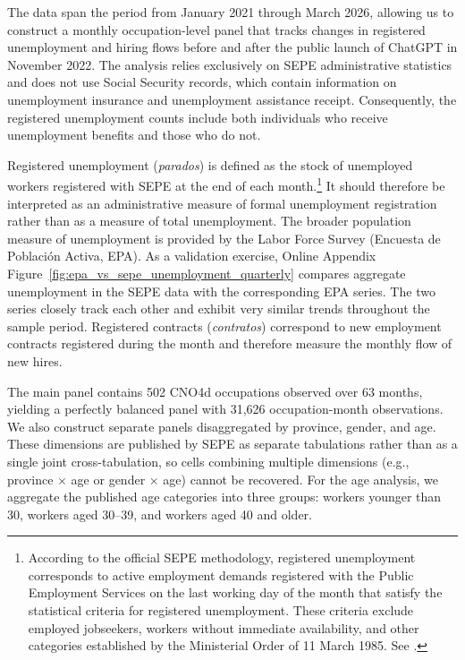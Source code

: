 The data span the period from January 2021 through March 2026, allowing us to construct a monthly occupation-level panel that tracks changes in registered unemployment and hiring flows before and after the public launch of ChatGPT in November 2022. The analysis relies exclusively on SEPE administrative statistics and does not use Social Security records, which contain information on unemployment insurance and unemployment assistance receipt. Consequently, the registered unemployment counts include both individuals who receive unemployment benefits and those who do not.

Registered unemployment (\textit{parados}) is defined as the stock of unemployed workers registered with SEPE at the end of each month.\footnote{According to the official SEPE methodology, registered unemployment corresponds to active employment demands registered with the Public Employment Services on the last working day of the month that satisfy the statistical criteria for registered unemployment. These criteria exclude employed jobseekers, workers without immediate availability, and other categories established by the Ministerial Order of 11 March 1985. See \citet{mites_mlr_methodology}.} It should therefore be interpreted as an administrative measure of formal unemployment registration rather than as a measure of total unemployment. The broader population measure of unemployment is provided by the Labor Force Survey (Encuesta de Poblaci\'on Activa, EPA). As a validation exercise, Online Appendix Figure~\ref{fig:epa_vs_sepe_unemployment_quarterly} compares aggregate unemployment in the SEPE data with the corresponding EPA series. The two series closely track each other and exhibit very similar trends throughout the sample period. Registered contracts (\textit{contratos}) correspond to new employment contracts registered during the month and therefore measure the monthly flow of new hires.

The main panel contains 502 CNO4d occupations observed over 63 months, yielding a perfectly balanced panel with 31,626 occupation-month observations. We also construct separate panels disaggregated by province, gender, and age. These dimensions are published by SEPE as separate tabulations rather than as a single joint cross-tabulation, so cells combining multiple dimensions (e.g., province $\times$ age or gender $\times$ age) cannot be recovered. For the age analysis, we aggregate the published age categories into three groups: workers younger than 30, workers aged 30--39, and workers aged 40 and older.



